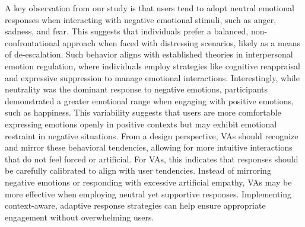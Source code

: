 A key observation from our study is that users tend to adopt neutral emotional responses when interacting with negative emotional stimuli, such as anger, sadness, and fear. This suggests that individuals prefer a balanced, non-confrontational approach when faced with distressing scenarios, likely as a means of de-escalation. Such behavior aligns with established theories in interpersonal emotion regulation, where individuals employ strategies like cognitive reappraisal and expressive suppression to manage emotional interactions. Interestingly, while neutrality was the dominant response to negative emotions, participants demonstrated a greater emotional range when engaging with positive emotions, such as happiness. This variability suggests that users are more comfortable expressing emotions openly in positive contexts but may exhibit emotional restraint in negative situations. From a design perspective, VAs should recognize and mirror these behavioral tendencies, allowing for more intuitive interactions that do not feel forced or artificial. For VAs, this indicates that responses should be carefully calibrated to align with user tendencies. Instead of mirroring negative emotions or responding with excessive artificial empathy, VAs may be more effective when employing neutral yet supportive responses. Implementing context-aware, adaptive response strategies can help ensure appropriate engagement without overwhelming users.

